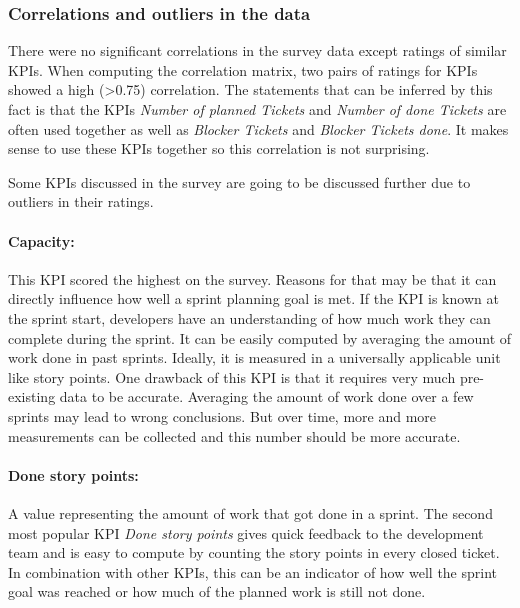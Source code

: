 \subsubsection*{Correlations and outliers in the data}

There were no significant correlations in the survey data except ratings of similar KPIs. 
When computing the correlation matrix, 
two pairs of ratings for KPIs showed a high (>0.75) correlation. 
The statements that can be inferred by this fact is that the KPIs \textit{Number of planned Tickets} and \textit{Number of done Tickets} are often used together as well as \textit{Blocker Tickets} and \textit{Blocker Tickets done}. 
It makes sense to use these KPIs together so this correlation is not surprising.

Some KPIs discussed in the survey are going to be discussed further due to outliers in their ratings.

\paragraph{\textbf{Capacity}:} This KPI scored the highest on the survey. Reasons for that may be that it can directly influence how well a sprint planning goal is met. If the KPI is known at the sprint start, developers have an understanding of how much work they can complete during the sprint. It can be easily computed by averaging the amount of work done in past sprints. Ideally, it is measured in a universally applicable unit like story points. One drawback of this KPI is that it requires very much pre-existing data to be accurate. Averaging the amount of work done over a few sprints may lead to wrong conclusions. But over time, more and more measurements can be collected and this number should be more accurate.

\paragraph{\textbf{Done story points}:} A value representing the amount of work that got done in a sprint. The second most popular KPI \textit{Done story points} gives quick feedback to the development team and is easy to compute by counting the story points in every closed ticket. In combination with other KPIs, this can be an indicator of how well the sprint goal was reached or how much of the planned work is still not done. 

